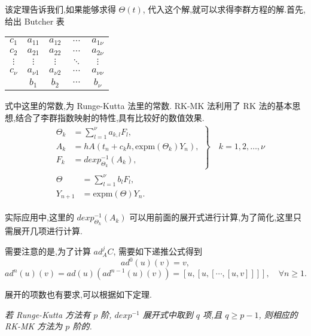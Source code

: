 该定理告诉我们,如果能够求得 $\Theta(t)$, 代入这个解,就可以求得李群方程的解.首先,给出 Butcher 表
\begin{center}
  \begin{tabular}{c|cccc}
    $c_1$&$a_{11}$&$a_{12}$&$\cdots$&$a_{1\nu}$\\
    $c_2$&$a_{21}$&$a_{22}$&$\cdots$&$a_{2\nu}$\\
    $\vdots$&$\vdots$&$\vdots$&$\ddots$&$\vdots$\\
    $c_{\nu}$&$a_{\nu 1}$&$a_{\nu 2}$&$\cdots$&$a_{\nu \nu}$\\
    \hline
         &$b_{1}$&$b_{2}$&$\cdots$&$b_{\nu}$
  \end{tabular}
\end{center}
式中这里的常数,为 Runge-Kutta 法里的常数. RK-MK 法利用了 RK 法的基本思想,结合了李群指数映射的特性,具有比较好的数值效果.
\begin{equation*}
	\begin{aligned}
		&\left.\begin{aligned}
		\Theta_k&=\sum_{l=1}^{\nu}a_{k,l}F_l,\\
		A_k&=hA(t_n+c_kh,\mbox{expm}(\Theta_k)Y_n),\\
		F_k&=dexp_{\Theta_k}^{-1}(A_k),
	\end{aligned}\right\rbrace \quad k=1,2,\ldots,\nu\\
		&\begin{aligned}
		\Theta&=\sum_{l=1}^{\nu}b_lF_l,\\
		Y_{n+1}&=\mbox{expm}(\Theta)Y_n.
	\end{aligned}
	\end{aligned}
\end{equation*}

实际应用中,这里的 $dexp_{\Theta_k}^{-1}(A_k)$ 可以用前面的展开式进行计算,为了简化,这里只需展开几项进行计算.

需要注意的是,为了计算 $ad^j_AC$, 需要如下递推公式得到
\begin{equation*}
	ad^0(u)(v)=v,
\end{equation*}
\begin{equation*}
	ad^n(u)(v)=ad(u)(ad^{n-1}(u)(v))=[u,[u,[\cdots,[u,v]]]],\quad \forall n \geq 1.
\end{equation*}

展开的项数也有要求,可以根据如下定理.
\begin{theorem}
	\emph{若 Runge-Kutta 方法有 $p$ 阶, $dexp^{-1}$ 展开式中取到 $q$ 项,且 $q\geq p-1$, 则相应的 RK-MK 方法为 $p$ 阶的.}
\end{theorem}

